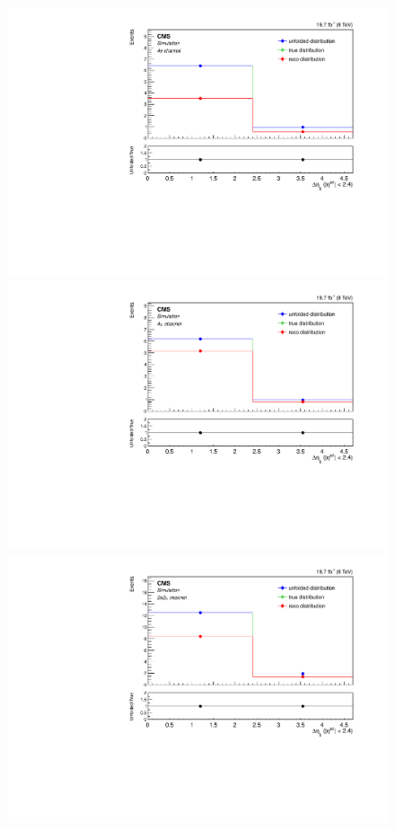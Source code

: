 \begin{figure}[hbtp]
  \begin{center}
    \includegraphics[width=0.8\cmsFigWidth]{Figures/Unfolding/MCTests/CentralDeta_ZZTo4e_MadMatrix_MadDistr_FullSample_fr}     
    \includegraphics[width=0.8\cmsFigWidth]{Figures/Unfolding/MCTests/CentralDeta_ZZTo4m_MadMatrix_MadDistr_FullSample_fr}     
    \includegraphics[width=0.8\cmsFigWidth]{Figures/Unfolding/MCTests/CentralDeta_ZZTo2e2m_MadMatrix_MadDistr_FullSample_fr}

\end{center}
\end{figure}
